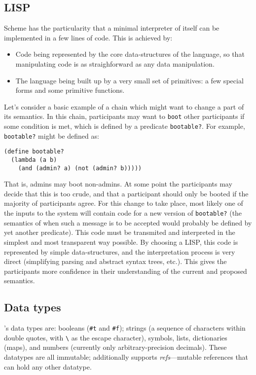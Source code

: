 \subsection{LISP}

Scheme has the particularity that a minimal interpreter of itself can
be implemented in a few lines of code. This is achieved by:
\begin{itemize}
  \item Code being represented by the core data-structures of the language, so
      that manipulating code is as straighforward as any data manipulation.
  \item The language being built up by a very small set of primitives: a few
    special forms and some primitive functions.
\end{itemize}
Let's consider a basic example of a chain which might want to change a part of
its semantics. In this chain, participants may want to \texttt{boot} other
participants if some condition is met, which is defined by a predicate
\texttt{bootable?}. For example, \texttt{bootable?} might be defined as:
\begin{lstlisting}
(define bootable?
  (lambda (a b)
    (and (admin? a) (not (admin? b)))))
\end{lstlisting}
That is, admins may boot non-admins. At some point the participants may decide
that this is too crude, and that a participant should only be booted if the
majority of participants agree. For this change to take place, most likely one of
the inputs to the system will contain code for a new version of
\texttt{bootable?} (the semantics of when such a message is to be accepted would
probably be defined by yet another predicate). This code must be transmited and
interpreted in the simplest and most transparent way possible. By choosing a LISP,
this code is represented by simple data-structures, and the interpretation process is
very direct (simplifying parsing and abstract syntax trees, etc.). This
gives the participants more confidence in their understanding of the current and
proposed semantics.

\subsection{Data types}
\rad{}'s data types are: booleans (\texttt{\#t} and
\texttt{\#f}); strings (a sequence of characters within double quotes, with
\verb$\$ as the escape character), symbols, lists, dictionaries
(maps), and numbers (currently only arbitrary-precision decimals). These
datatypes are all immutable; additionally \rad{} supports \emph{refs}---mutable
references that can hold any other datatype.

